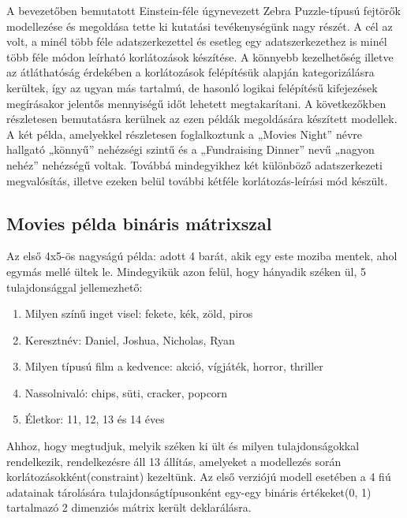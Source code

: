 \documentclass[12pt,a4paper,twoside, openright]{report}
\begin{document}
    A bevezetőben bemutatott Einstein-féle úgynevezett Zebra Puzzle-típusú fejtörők\cite{zebra} modellezése és megoldása tette ki kutatási tevékenységünk nagy részét.
    A cél az volt, a minél több féle adatszerkezettel és esetleg egy adatszerkezethez is minél több féle módon leírható korlátozások készítése.
    A könnyebb kezelhetőség illetve az átláthatóság érdekében a korlátozások felépítésük alapján kategorizálásra kerültek, így az ugyan más tartalmú, de hasonló logikai felépítésű kifejezések megírásakor jelentős mennyiségű időt lehetett megtakarítani.
    A következőkben részletesen bemutatásra kerülnek az ezen példák megoldására készített modellek.
    A két példa, amelyekkel részletesen foglalkoztunk a „Movies Night” névre hallgató „könnyű” nehézségi szintű és a „Fundraising Dinner” nevű „nagyon nehéz” nehézségű voltak.
    Továbbá mindegyikhez két különböző adatszerkezeti megvalósítás, illetve ezeken belül további kétféle korlátozás-leírási mód készült.

\subsection{Movies példa bináris mátrixszal}

    Az első 4x5-ös nagyságú példa: adott 4 barát, akik egy este moziba mentek, ahol egymás mellé ültek le.
    Mindegyikük azon felül, hogy hányadik széken ül, 5 tulajdonsággal jellemezhető:
    \begin{enumerate}
    	\item Milyen színű inget visel: fekete, kék, zöld, piros
    	\item Keresztnév: Daniel, Joshua, Nicholas, Ryan
    	\item Milyen típusú film a kedvence: akció, vígjáték, horror, thriller
    	\item Nassolnivaló: chips, süti, cracker, popcorn
    	\item Életkor: 11, 12, 13 és 14 éves
    \end{enumerate}
    Ahhoz, hogy megtudjuk, melyik széken ki ült és milyen tulajdonságokkal rendelkezik, rendelkezésre áll 13 állítás, amelyeket a modellezés során korlátozásokként(constraint) kezeltünk.
    Az első verziójú modell esetében a 4 fiú adatainak tárolására tulajdonságtípusonként egy-egy bináris értékeket(0, 1) tartalmazó 2 dimenziós mátrix került deklarálásra.
\end{document}
